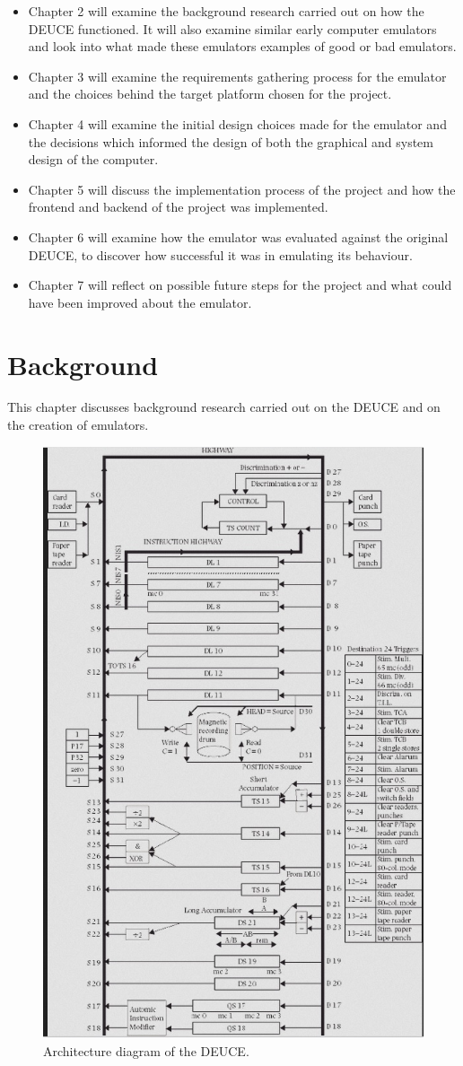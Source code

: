 \documentclass{l4proj}
\begin{document}
\begin{itemize}
	\item Chapter 2 will examine the background research carried out on how the DEUCE functioned. It will also examine similar early computer emulators and look into what made these emulators examples of good or bad emulators.
	\item Chapter 3 will examine the requirements gathering process for the emulator and the choices behind the target platform chosen for the project.
	\item Chapter 4 will examine the initial design choices made for the emulator and the decisions which informed the design of both the graphical and system design of the computer.
	\item Chapter 5 will discuss the implementation process of the project and how the frontend and backend of the project was implemented.
	\item Chapter 6 will examine how the emulator was evaluated against the original DEUCE, to discover how successful it was in emulating its behaviour.
	\item Chapter 7 will reflect on possible future steps for the project and what could have been improved about the emulator. 
\end{itemize}

\chapter{Background}
This chapter discusses background research carried out on the DEUCE and on the creation of emulators.
\begin{figure}[h]
	\centering
	\includegraphics[width=0.5\linewidth]{images/deuce-arch.jpg} 
	\caption{Architecture diagram of the DEUCE.}
	\label{fig:arch}
\end{figure}
\end{document}
